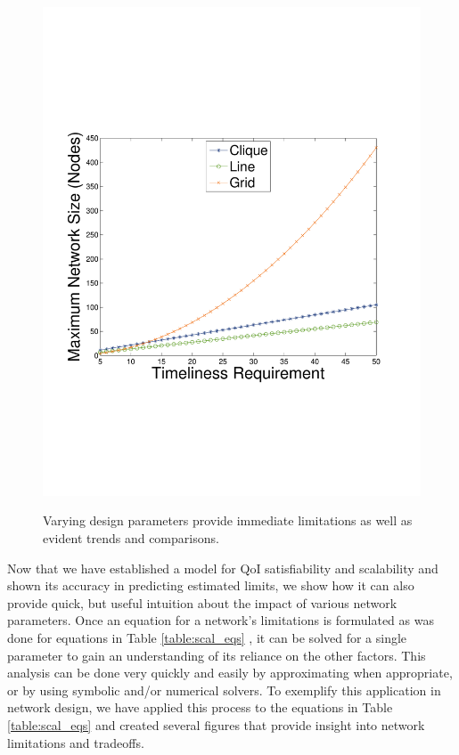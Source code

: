 \begin{figure}
{	\includegraphics[scale=0.22, clip=true, trim=14mm 65mm 25mm 65mm]{figures/use_cases_examples/num_nodes_vs_tness_5_SS_12_IS_color.pdf}
        \label{fig:use_case_num_nodes_vs_qoi_2}
        }

   \caption{Varying design parameters provide immediate limitations as well as evident trends and comparisons.}
   \label{fig:huh_net_design}
   \vspace{-5mm}
\end{figure}
 
Now that we have established a model for QoI satisfiability and scalability and shown its accuracy in predicting estimated limits, we show how it can also provide quick, but useful intuition about the impact of various network parameters.  Once an equation for a network's limitations is formulated as was done for equations in Table \ref{table:scal_eqs} %
, it can be solved for a single parameter to gain an understanding of its reliance on the other factors.  This analysis can be done very quickly and easily by approximating when appropriate, or by using symbolic and/or numerical solvers.  To exemplify this application in network design, we have applied this process to the equations in Table \ref{table:scal_eqs} %
and created several figures that provide insight into network limitations and tradeoffs.

